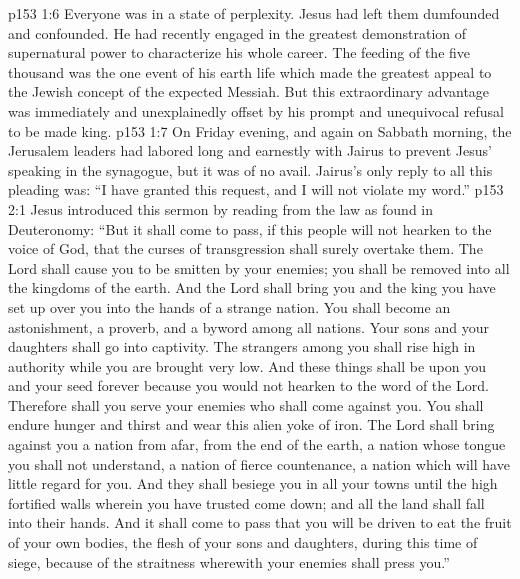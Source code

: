 \vs p153 1:6 Everyone was in a state of perplexity. Jesus had left them dumfounded and confounded. He had recently engaged in the greatest demonstration of supernatural power to characterize his whole career. The feeding of the five thousand was the one event of his earth life which made the greatest appeal to the Jewish concept of the expected Messiah. But this extraordinary advantage was immediately and unexplainedly offset by his prompt and unequivocal refusal to be made king.
\vs p153 1:7 On Friday evening, and again on Sabbath morning, the Jerusalem leaders had labored long and earnestly with Jairus to prevent Jesus’ speaking in the synagogue, but it was of no avail. Jairus’s only reply to all this pleading was: “I have granted this request, and I will not violate my word.”
\vs p153 2:1 Jesus introduced this sermon by reading from the law as found in Deuteronomy: \textcolor{ubdarkred}{“But it shall come to pass, if this people will not hearken to the voice of God, that the curses of transgression shall surely overtake them. The Lord shall cause you to be smitten by your enemies; you shall be removed into all the kingdoms of the earth. And the Lord shall bring you and the king you have set up over you into the hands of a strange nation. You shall become an astonishment, a proverb, and a byword among all nations. Your sons and your daughters shall go into captivity. The strangers among you shall rise high in authority while you are brought very low. And these things shall be upon you and your seed forever because you would not hearken to the word of the Lord. Therefore shall you serve your enemies who shall come against you. You shall endure hunger and thirst and wear this alien yoke of iron. The Lord shall bring against you a nation from afar, from the end of the earth, a nation whose tongue you shall not understand, a nation of fierce countenance, a nation which will have little regard for you. And they shall besiege you in all your towns until the high fortified walls wherein you have trusted come down; and all the land shall fall into their hands. And it shall come to pass that you will be driven to eat the fruit of your own bodies, the flesh of your sons and daughters, during this time of siege, because of the straitness wherewith your enemies shall press you.”}
